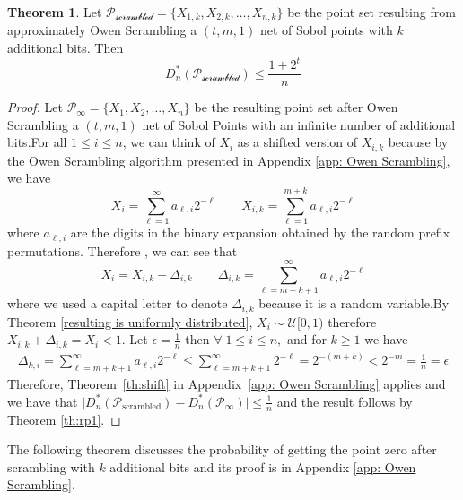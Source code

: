 \documentclass{article}
\theoremstyle{definition}
\newtheorem{theorem}[definition]{Theorem}
\begin{document}
\begin{theorem}
\label{thm: approximate scrambling}
    Let $\mathcal{P_{\text{scrambled}}}=\{X_{1,k},X_{2,k},\ldots,X_{n,k}\} $ be the point set resulting from approximately Owen Scrambling a $(t,m,1)$ net of Sobol points with $k$ additional bits. Then \begin{equation}
    \label{same bound one}
        D_n^{\ast}(\mathcal{P_{\text{scrambled}}})\leq\frac{1+2^t}{n}
    \end{equation}
\end{theorem}
\begin{proof}
     Let $\mathcal{P}_{\infty}=\{X_1,X_2,\ldots,X_n\}$ be the resulting point set after Owen Scrambling a $(t,m,1)$ net of Sobol Points with an infinite number of additional bits.For all $1\leq i\leq n$, we can think of $X_{i}$ as a shifted version of $X_{i,k}$ because by the Owen Scrambling algorithm presented in Appendix \ref{app: Owen Scrambling}, we have \begin{equation}
         X_i=\sum_{\ell=1}^\infty a_{\ell,i}2^{-\ell} \qquad X_{i,k}=\sum_{\ell=1}^{m+k} a_{\ell,i}2^{-\ell} 
     \end{equation}   
    \noindent where $a_{\ell,i}$ are the digits in the binary expansion obtained by the random prefix permutations.
\noindent Therefore , we can see that \begin{equation}
    X_i=X_{i,k}+\Delta_{i,k} \qquad \Delta_{i,k}=\sum_{\ell=m+k+1}^{\infty}a_{\ell,i}2^{-\ell}
\end{equation}
where we used a capital letter to denote $\Delta_{i,k}$ because it is a random variable.By Theorem \ref{resulting is uniformly distributed}, $X_i\sim\mathcal{U}[0,1)$ therefore $X_{i,k}+\Delta_{i,k}=X_i<1$. Let $\epsilon=\frac{1}{n}$ then $\forall\; 1\leq i\leq n,$ and for $k\geq1$  we have \begin{align}
    \Delta_{k,i}=\sum_{\ell=m+k+1}^{\infty}a_{\ell,i}2^{-\ell} \leq \sum_{\ell=m+k+1}^{\infty}2^{-\ell}=2^{-(m+k)} <2^{-m}=\frac{1}{n}=\epsilon
\end{align}
Therefore, Theorem~\ref{th:shift} in Appendix~\ref{app: Owen Scrambling} applies and we have that $\lvert D_n^{\ast}(\mathcal{P}_{\text{scrambled}}) - D_n^{\ast}(\mathcal{P}_{\infty})\rvert \leq \frac{1}{n}$ and the result follows by Theorem \ref{th:rp1}.\end{proof}
 \noindent The following theorem discusses the probability of getting the point zero  after scrambling with $k$ additional bits and its proof is in Appendix \ref{app: Owen Scrambling}.
\end{document}
